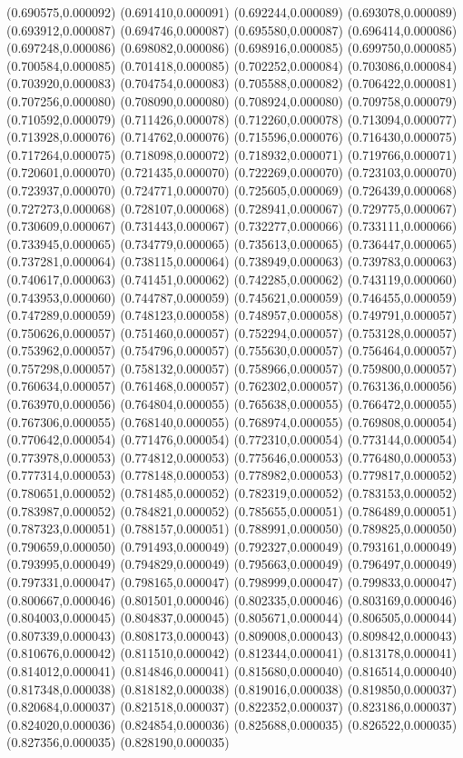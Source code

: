 {(0.690575,0.000092) (0.691410,0.000091) (0.692244,0.000089) (0.693078,0.000089) (0.693912,0.000087) (0.694746,0.000087) (0.695580,0.000087) (0.696414,0.000086) (0.697248,0.000086) (0.698082,0.000086) (0.698916,0.000085) (0.699750,0.000085) (0.700584,0.000085) (0.701418,0.000085) (0.702252,0.000084) (0.703086,0.000084) (0.703920,0.000083) (0.704754,0.000083) (0.705588,0.000082) (0.706422,0.000081) (0.707256,0.000080) (0.708090,0.000080) (0.708924,0.000080) (0.709758,0.000079) (0.710592,0.000079) (0.711426,0.000078) (0.712260,0.000078) (0.713094,0.000077) (0.713928,0.000076) (0.714762,0.000076) (0.715596,0.000076) (0.716430,0.000075) (0.717264,0.000075) (0.718098,0.000072) (0.718932,0.000071) (0.719766,0.000071) (0.720601,0.000070) (0.721435,0.000070) (0.722269,0.000070) (0.723103,0.000070) (0.723937,0.000070) (0.724771,0.000070) (0.725605,0.000069) (0.726439,0.000068) (0.727273,0.000068) (0.728107,0.000068) (0.728941,0.000067) (0.729775,0.000067) (0.730609,0.000067) (0.731443,0.000067) (0.732277,0.000066) (0.733111,0.000066) (0.733945,0.000065) (0.734779,0.000065) (0.735613,0.000065) (0.736447,0.000065) (0.737281,0.000064) (0.738115,0.000064) (0.738949,0.000063) (0.739783,0.000063) (0.740617,0.000063) (0.741451,0.000062) (0.742285,0.000062) (0.743119,0.000060) (0.743953,0.000060) (0.744787,0.000059) (0.745621,0.000059) (0.746455,0.000059) (0.747289,0.000059) (0.748123,0.000058) (0.748957,0.000058) (0.749791,0.000057) (0.750626,0.000057) (0.751460,0.000057) (0.752294,0.000057) (0.753128,0.000057) (0.753962,0.000057) (0.754796,0.000057) (0.755630,0.000057) (0.756464,0.000057) (0.757298,0.000057) (0.758132,0.000057) (0.758966,0.000057) (0.759800,0.000057) (0.760634,0.000057) (0.761468,0.000057) (0.762302,0.000057) (0.763136,0.000056) (0.763970,0.000056) (0.764804,0.000055) (0.765638,0.000055) (0.766472,0.000055) (0.767306,0.000055) (0.768140,0.000055) (0.768974,0.000055) (0.769808,0.000054) (0.770642,0.000054) (0.771476,0.000054) (0.772310,0.000054) (0.773144,0.000054) (0.773978,0.000053) (0.774812,0.000053) (0.775646,0.000053) (0.776480,0.000053) (0.777314,0.000053) (0.778148,0.000053) (0.778982,0.000053) (0.779817,0.000052) (0.780651,0.000052) (0.781485,0.000052) (0.782319,0.000052) (0.783153,0.000052) (0.783987,0.000052) (0.784821,0.000052) (0.785655,0.000051) (0.786489,0.000051) (0.787323,0.000051) (0.788157,0.000051) (0.788991,0.000050) (0.789825,0.000050) (0.790659,0.000050) (0.791493,0.000049) (0.792327,0.000049) (0.793161,0.000049) (0.793995,0.000049) (0.794829,0.000049) (0.795663,0.000049) (0.796497,0.000049) (0.797331,0.000047) (0.798165,0.000047) (0.798999,0.000047) (0.799833,0.000047) (0.800667,0.000046) (0.801501,0.000046) (0.802335,0.000046) (0.803169,0.000046) (0.804003,0.000045) (0.804837,0.000045) (0.805671,0.000044) (0.806505,0.000044) (0.807339,0.000043) (0.808173,0.000043) (0.809008,0.000043) (0.809842,0.000043) (0.810676,0.000042) (0.811510,0.000042) (0.812344,0.000041) (0.813178,0.000041) (0.814012,0.000041) (0.814846,0.000041) (0.815680,0.000040) (0.816514,0.000040) (0.817348,0.000038) (0.818182,0.000038) (0.819016,0.000038) (0.819850,0.000037) (0.820684,0.000037) (0.821518,0.000037) (0.822352,0.000037) (0.823186,0.000037) (0.824020,0.000036) (0.824854,0.000036) (0.825688,0.000035) (0.826522,0.000035) (0.827356,0.000035) (0.828190,0.000035) }
